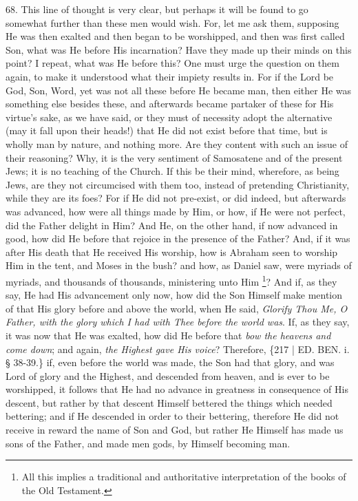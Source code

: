 68. This line of thought is
very clear, but perhaps it will be found to go somewhat further than
these men would wish. For, let me ask them, supposing He was then
exalted and then began to be worshipped, and then was first
called Son, what was He before His incarnation? Have they made up
their minds on this point? I repeat, what was He before this? One must
urge the question on them again, to make it understood what their
impiety results in. For if the Lord be God, Son, Word, yet was not all
these before He became man, then either He was something else besides
these, and afterwards became partaker of these for His virtue's sake,
as we have said, or they must of necessity adopt the alternative (may
it fall upon their heads!) that He did not exist before that time, but
is wholly man by nature, and nothing more. Are they content with such
an issue of their reasoning? Why, it is the very sentiment of
Samosatene and of the present Jews; it is no teaching of the Church.
If this be their mind, wherefore, as being Jews, are they not
circumcised with them too, instead of pretending Christianity, while
they are its foes? For if He did not pre-exist, or did indeed, but
afterwards was advanced, how were all things made by Him, or how, if
He were not perfect, did the Father delight in Him? And He, on the
other hand, if now advanced in good, how did He before that rejoice in
the presence of the Father? And, if it was after His death that He
received His worship, how is Abraham seen to worship Him in the tent,
and Moses in the bush? and how, as Daniel saw, were myriads of
myriads, and thousands of thousands, ministering unto Him \footnote{All this implies a traditional and authoritative interpretation of the
books of the Old Testament.}? And if, as they say, He had His advancement only now, how did
the Son Himself make mention of that His glory before and above the
world, when He said, \emph{Glorify Thou Me, O Father, with the glory
which I had with Thee before the world was}. If, as they say, it
was now that He was exalted, how did He before that \emph{bow the heavens
and come down}; and again, \emph{the Highest gave His voice}?
Therefore, \{217 | ED. BEN. i. § 38-39.\}
if, even before the world was made, the Son had that glory, and was
Lord of glory and the Highest, and descended from heaven, and is ever
to be worshipped, it follows that He had no advance in greatness in
consequence of His descent, but rather by that descent Himself
bettered the things which needed bettering; and if He descended in
order to their bettering, therefore He did not receive in reward the
name of Son and God, but rather He Himself has made us sons of the
Father, and made men gods, by Himself becoming man.

